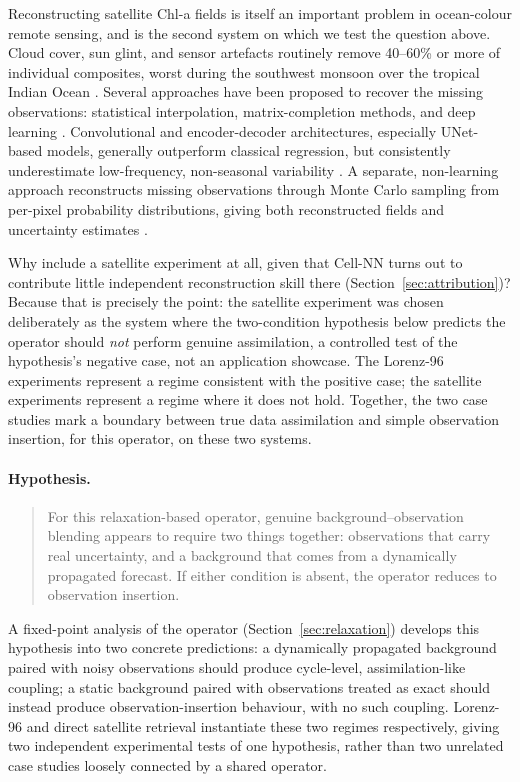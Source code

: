 \documentclass[final,5p,times,twocolumn,authoryear]{elsarticle}
\begin{document}
Reconstructing satellite Chl-a fields is itself an important problem
in ocean-colour remote sensing, and is the second system on which we
test the question above. Cloud cover, sun glint, and sensor
artefacts routinely remove 40--60\% or more of individual
composites, worst during the southwest monsoon over the tropical
Indian Ocean \citep{roxy2016}. Several approaches have been proposed
to recover the missing observations: statistical interpolation,
matrix-completion methods, and deep learning \citep{jouini2013}.
Convolutional and encoder-decoder architectures, especially
UNet-based models, generally outperform classical regression, but
consistently underestimate low-frequency, non-seasonal variability
\citep{martinez2020frontiers,martinez2020remotesensing}. A separate,
non-learning approach reconstructs missing observations through
Monte Carlo sampling from per-pixel probability distributions, giving
both reconstructed fields and uncertainty estimates
\citep{modi2022montecarlo}.

Why include a satellite experiment at all, given that Cell-NN turns
out to contribute little independent reconstruction skill there
(Section~\ref{sec:attribution})? Because that is precisely the point:
the satellite experiment was chosen deliberately as the system where
the two-condition hypothesis below predicts the operator should
\emph{not} perform genuine assimilation, a controlled test of the
hypothesis's negative case, not an application showcase. The Lorenz-96
experiments represent a regime consistent with the positive case;
the satellite experiments represent a regime where it does not hold.
Together, the two case studies mark a boundary between true data
assimilation and simple observation insertion, for this operator, on
these two systems.

\paragraph{Hypothesis.}
\begin{quote}
For this relaxation-based operator, genuine background--observation
blending appears to require two things together: observations that
carry real uncertainty, and a background that comes from a
dynamically propagated forecast. If either condition is absent, the
operator reduces to observation insertion.
\end{quote}

A fixed-point analysis of the operator (Section~\ref{sec:relaxation})
develops this hypothesis into two concrete predictions: a dynamically
propagated background paired with noisy observations should produce
cycle-level, assimilation-like coupling; a static background paired
with observations treated as exact should instead produce
observation-insertion behaviour, with no such coupling. Lorenz-96 and
direct satellite retrieval instantiate these two regimes respectively,
giving two independent experimental tests of one hypothesis, rather
than two unrelated case studies loosely connected by a shared
operator.
\end{document}
